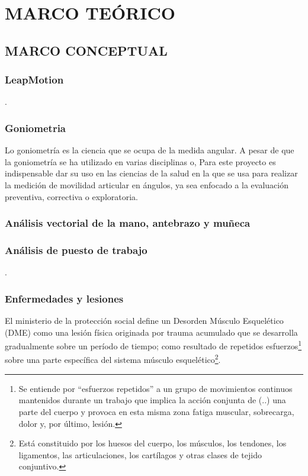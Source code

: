 \chapter{MARCO TEÓRICO}
\section{MARCO CONCEPTUAL}
\subsection{LeapMotion}
.
\subsection{Goniometria}

Lo goniometría es la ciencia que se ocupa de la medida angular. A pesar de que la goniometría se ha utilizado en varias disciplinas o, Para este proyecto es indispensable dar su uso en las ciencias de la salud en la que se usa para realizar la medición de movilidad articular en ángulos, ya sea enfocado a la  evaluación preventiva, correctiva o exploratoria.


\subsection{Análisis vectorial de la mano, antebrazo y muñeca}



\subsection{Análisis de puesto de trabajo}
.
\subsection{Enfermedades y lesiones}
El ministerio de la protección social \parencite{MinisteriodeProteccionSocialdeColombia2006GuiaSuperiores} define un Desorden Músculo Esquelético (DME) como una lesión física originada por trauma acumulado que se desarrolla gradualmente sobre un período de tiempo; como resultado de repetidos esfuerzos\footnote{Se entiende por “esfuerzos repetidos” a un grupo de movimientos continuos mantenidos durante un trabajo que implica la acción conjunta de (..) una parte del cuerpo y provoca en esta misma zona fatiga muscular, sobrecarga, dolor y, por último, lesión.\parencite{INSHT2016PrevencionRepetidos}} sobre una parte específica del sistema músculo esquelético\footnote{Está constituido por los huesos del cuerpo, los músculos, los tendones, los ligamentos, las articulaciones, los cartílagos y otras clases de tejido conjuntivo.}. 
 
